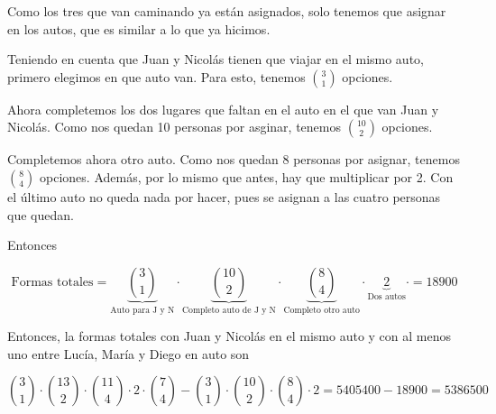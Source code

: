 \begin{itemize}
    Como los tres que van caminando ya están asignados, solo tenemos que asignar en los autos, que es similar a lo que ya hicimos. \bigskip

    Teniendo en cuenta que Juan y Nicolás tienen que viajar en el mismo auto, primero elegimos en que auto van. Para esto, 
    tenemos $\binom{3}{1}$ opciones. \bigskip

    Ahora completemos los dos lugares que faltan en el auto en el que van Juan y Nicolás. Como nos quedan 10 personas por asginar, 
    tenemos $\binom{10}{2}$ opciones. \bigskip

    Completemos ahora otro auto. Como nos quedan 8 personas por asignar, tenemos $\binom{8}{4}$ opciones. Además, por lo mismo que antes,
    hay que multiplicar por 2. Con el último auto no queda nada por hacer, pues se asignan a las cuatro personas que quedan. \bigskip

    Entonces

    $$
    \text{Formas totales} = 
    \underbrace{\binom{3}{1}}_{\text{Auto para J y N}} \cdot
    \underbrace{\binom{10}{2}}_{\text{Completo auto de J y N}} \cdot
    \underbrace{\binom{8}{4}}_{\text{Completo otro auto}} \cdot
    \underbrace{2}_{\text{Dos autos}} \cdot
    =18900
    $$

\end{itemize}


Entonces, la formas totales con Juan y Nicolás en el mismo auto y con al menos uno entre Lucía, María y Diego en auto son

$$
\binom{3}{1} \cdot \binom{13}{2} \cdot \binom{11}{4} \cdot 2 \cdot \binom{7}{4}
-
\binom{3}{1} \cdot \binom{10}{2} \cdot \binom{8}{4} \cdot 2 
=5405400-18900= \boxed{5386500}
$$

\begin{aportes}
    \item {}
\end{aportes}

   


    